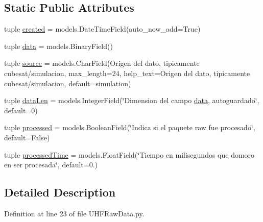 \subsection*{Static Public Attributes}
\begin{DoxyCompactItemize}
\item 
tuple \hyperlink{class_ground_segment_1_1models_1_1_u_h_f_raw_data_1_1_u_h_f_raw_data_ac9fc4f0ad0f0b8e8f4b45b54fbdd93d4}{created} = models.\+Date\+Time\+Field(auto\+\_\+now\+\_\+add=True)
\item 
tuple \hyperlink{class_ground_segment_1_1models_1_1_u_h_f_raw_data_1_1_u_h_f_raw_data_a617ee1b3a10bfb1dbdad7f5e58ecd111}{data} = models.\+Binary\+Field()
\item 
tuple \hyperlink{class_ground_segment_1_1models_1_1_u_h_f_raw_data_1_1_u_h_f_raw_data_af793b6af185be9c8f4895d2600959b3e}{source} = models.\+Char\+Field(\textquotesingle{}Origen del dato, tipicamente cubesat/simulacion\textquotesingle{}, max\+\_\+length=24, help\+\_\+text=\textquotesingle{}Origen del dato, tipicamente cubesat/simulacion\textquotesingle{}, default=\textquotesingle{}simulation\textquotesingle{})
\item 
tuple \hyperlink{class_ground_segment_1_1models_1_1_u_h_f_raw_data_1_1_u_h_f_raw_data_a61b9ad50a4b98a17adcf65d05fe213c5}{data\+Len} = models.\+Integer\+Field(\char`\"{}Dimension del campo \hyperlink{class_ground_segment_1_1models_1_1_u_h_f_raw_data_1_1_u_h_f_raw_data_a617ee1b3a10bfb1dbdad7f5e58ecd111}{data}, autoguardado\char`\"{}, default=0)
\item 
tuple \hyperlink{class_ground_segment_1_1models_1_1_u_h_f_raw_data_1_1_u_h_f_raw_data_adbe87941b9b4c940ea568a956948eba7}{processed} = models.\+Boolean\+Field(\char`\"{}Indica si el paquete raw fue procesado\char`\"{}, default=False)
\item 
tuple \hyperlink{class_ground_segment_1_1models_1_1_u_h_f_raw_data_1_1_u_h_f_raw_data_a7245dcecd5a04a8f20c3f968a356be44}{processed\+Time} = models.\+Float\+Field(\char`\"{}Tiempo en milisegundos que domoro en ser procesada\char`\"{}, default=0.)
\end{DoxyCompactItemize}


\subsection{Detailed Description}


Definition at line 23 of file U\+H\+F\+Raw\+Data.\+py.



